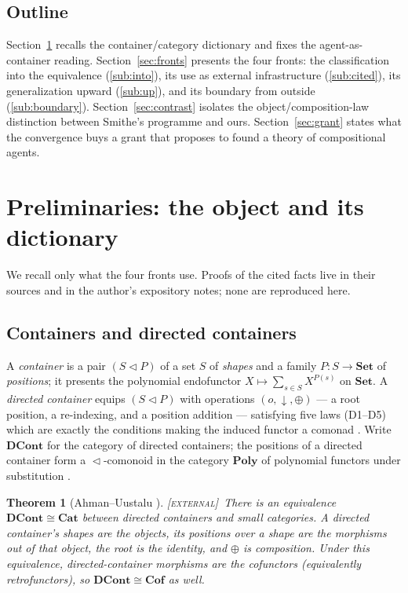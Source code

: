\documentclass[11pt]{amsart}
\theoremstyle{plain}
\newtheorem{theorem}{Theorem}
\theoremstyle{definition}
\newcommand{\Set}{\mathbf{Set}}
\newcommand{\Cat}{\mathbf{Cat}}
\newcommand{\Poly}{\mathbf{Poly}}
\newcommand{\DCont}{\mathbf{DCont}}
\newcommand{\Cof}{\mathbf{Cof}}
\newcommand{\seq}{\vartriangleleft}
\newcommand{\iso}{\cong}
\newcommand{\gExternal}{\textsc{[external]}}
\begin{document}
\subsection*{Outline}
Section~\ref{sec:prelim} recalls the container/category dictionary and fixes the
agent-as-container reading. Section~\ref{sec:fronts} presents the four fronts: the classification
into the equivalence (\ref{sub:into}), its use as external infrastructure (\ref{sub:cited}), its
generalization upward (\ref{sub:up}), and its boundary from outside (\ref{sub:boundary}).
Section~\ref{sec:contrast} isolates the object/composition-law distinction between Smithe's
programme and ours. Section~\ref{sec:grant} states what the convergence buys a grant that
proposes to found a theory of compositional agents.

\section{Preliminaries: the object and its dictionary}\label{sec:prelim}

We recall only what the four fronts use. Proofs of the cited facts live in their sources and in
the author's expository notes; none are reproduced here.

\subsection*{Containers and directed containers}
A \emph{container} is a pair $(S \seq P)$ of a set $S$ of \emph{shapes} and a family
$P\colon S\to\Set$ of \emph{positions}; it presents the polynomial endofunctor
$X\mapsto\sum_{s\in S}X^{P(s)}$ on $\Set$. A \emph{directed container} equips $(S\seq P)$ with
operations $(o,\downarrow,\oplus)$ --- a root position, a re-indexing, and a position addition
--- satisfying five laws (D1--D5) which are exactly the conditions making the induced functor a
comonad \cite{AhmanUustalu}. Write $\DCont$ for the category of directed containers; the
positions of a directed container form a $\seq$-comonoid in the category $\Poly$ of polynomial
functors under substitution \cite{NiuSpivak}.

\begin{theorem}[Ahman--Uustalu \cite{AhmanUustalu}]\label{thm:AU}
\gExternal\ There is an equivalence $\DCont\iso\Cat$ between directed containers and small
categories. A directed container's shapes are the objects, its positions over a shape are the
morphisms out of that object, the root is the identity, and $\oplus$ is composition.
Under this equivalence, directed-container morphisms are the \emph{cofunctors} (equivalently
retrofunctors), so $\DCont\iso\Cof$ as well.
\end{theorem}
\end{document}
